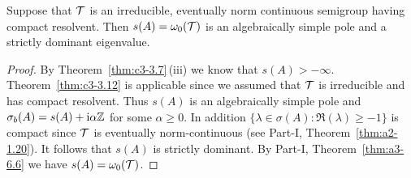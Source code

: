 \begin{corollary}\label{cor:c3-3.17}
	Suppose that $\mathcal{T}$ is an irreducible, eventually norm continuous semigroup having compact resolvent.
	Then $s(A) = \omega_0(\mathcal{T})$ is an algebraically simple pole and a strictly dominant eigenvalue.
\end{corollary}
\begin{proof}
	By Theorem~\ref{thm:c3-3.7}\,(iii) we know that $s(A) > -\infty$. 
	Theorem~\ref{thm:c3-3.12} is applicable since we assumed that $\mathcal{T}$ is irreducible and has compact resolvent.
	Thus $s(A)$ is an algebraically simple pole and $\sigma_{b}(A) = s(A) + \mathrm{i}\alpha\mathbb{Z}$ for some $\alpha \geq 0$. 
	In addition $\{\lambda \in \sigma(A) \colon \Re(\lambda) \geq -1\}$ is compact since $\mathcal{T}$ is eventually norm-continuous (see Part-I, Theorem~\ref{thm:a2-1.20}). 
	It follows that $s(A)$ is strictly dominant.
	By Part-I, Theorem~\ref{thm:a3-6.6} we have $s(A) = \omega_0(\mathcal{T})$.
\end{proof}
 
